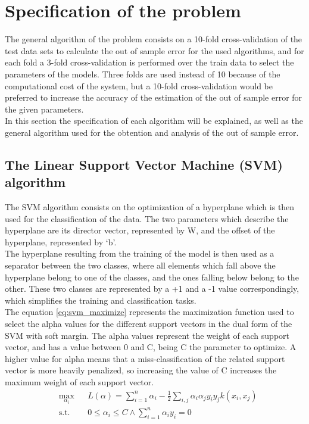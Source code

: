 \documentclass[10pt, journal]{IEEEtran}
\begin{document}
\section{Specification of the problem} %
\label{sec:specification_of_the_problem}
The general algorithm of the problem consists on a 10-fold cross-validation of the test data sets to calculate the out of sample error for the used algorithms, and for each fold a 3-fold cross-validation is performed over the train data to select the parameters of the models. Three folds are used instead of 10 because of the computational cost of the system, but a 10-fold cross-validation would be preferred to increase the accuracy of the estimation of the out of sample error for the given parameters.\\

In this section the specification of each algorithm will be explained, as well as the general algorithm used for the obtention and analysis of the out of sample error.

\subsection{The Linear Support Vector Machine (SVM) algorithm} %
\label{sub:the_linear_support_vector_machine_svm_algorithm}
The SVM algorithm consists on the optimization of a hyperplane which is then used for the classification of the data. The two parameters which describe the hyperplane are its director vector, represented by W, and the offset of the hyperplane, represented by `b'.\\

The hyperplane resulting from the training of the model is then used as a separator between the two classes, where all elements which fall above the hyperplane belong to one of the classes, and the ones falling below belong to the other. These two classes are represented by a +1 and a -1 value correspondingly, which simplifies the training and classification tasks.\\

The equation \ref{eq:svm_maximize} represents the maximization function used to select the alpha values for the different support vectors in the dual form of the SVM with soft margin. The alpha values represent the weight of each support vector, and has a value between 0 and C, being C the parameter to optimize. A higher value for alpha means that a miss-classification of the related support vector is more heavily penalized, so increasing the value of C increases the maximum weight of each support vector.\\
\begin{equation}
	\begin{aligned}
		& \underset{\alpha_i}{\text{max}}
		& & L(\alpha) = \sum_{i=1}^{n}{\alpha_i} - \frac{1}{2}\sum_{i,j}\alpha_i\alpha_j y_i y_j k(x_i,x_j)\\
		& \text{s.t.}
		& & 0 \le \alpha_i \le C \land \sum_{i=1}^n{\alpha_i y_i} = 0
	\end{aligned}
	\label{eq:svm_maximize}
\end{equation}
\end{document}
